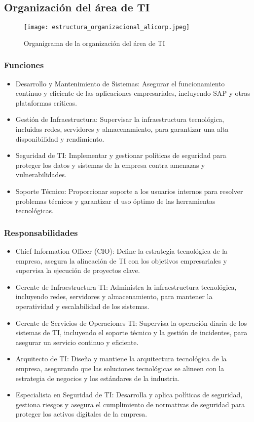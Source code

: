 \subsection{Organización del área de TI}
\begin{figure}[!ht]
    \centering
    \texttt{[image: estructura\_organizacional\_alicorp.jpeg]}
    \caption{Organigrama  de la organización del área de TI}
\end{figure}
    \subsubsection{Funciones}
    \begin{itemize}
        \item Desarrollo y Mantenimiento de Sistemas: Asegurar el funcionamiento continuo y eficiente de las aplicaciones empresariales, incluyendo SAP y otras plataformas críticas.
        \item Gestión de Infraestructura: Supervisar la infraestructura tecnológica, incluidas redes, servidores y almacenamiento, para garantizar una alta disponibilidad y rendimiento.
        \item Seguridad de TI: Implementar y gestionar políticas de seguridad para proteger los datos y sistemas de la empresa contra amenazas y vulnerabilidades.
        \item Soporte Técnico: Proporcionar soporte a los usuarios internos para resolver problemas técnicos y garantizar el uso óptimo de las herramientas tecnológicas.
    \end{itemize}
    \subsubsection{Responsabilidades}
    \begin{itemize}
        \item Chief Information Officer (CIO): Define la estrategia tecnológica de la empresa, asegura la alineación de TI con los objetivos empresariales y supervisa la ejecución de proyectos clave.
        \item Gerente de Infraestructura TI: Administra la infraestructura tecnológica, incluyendo redes, servidores y almacenamiento, para mantener la operatividad y escalabilidad de los sistemas.
        \item Gerente de Servicios de Operaciones TI: Supervisa la operación diaria de los sistemas de TI, incluyendo el soporte técnico y la gestión de incidentes, para asegurar un servicio continuo y eficiente.
        \item Arquitecto de TI: Diseña y mantiene la arquitectura tecnológica de la empresa, asegurando que las soluciones tecnológicas se alineen con la estrategia de negocios y los estándares de la industria.
        \item Especialista en Seguridad de TI: Desarrolla y aplica políticas de seguridad, gestiona riesgos y asegura el cumplimiento de normativas de seguridad para proteger los activos digitales de la empresa.
    \end{itemize}